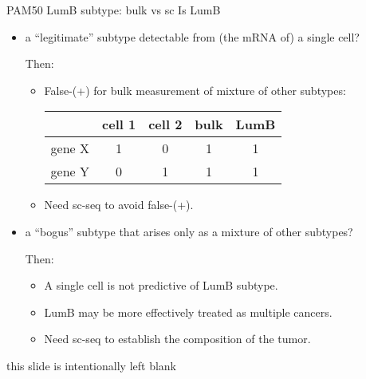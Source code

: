\documentclass[onepage]{beamer}
\begin{document}
\begin{frame}[t]{PAM50 LumB subtype: bulk vs sc}{}
	Is LumB 
	\begin{itemize}
	\item<1->
		a ``legitimate'' subtype detectable from (the mRNA of) a single cell? 
		
		Then:
		
		\begin{itemize}
		\item
			False-(+)
			for
			bulk measurement of mixture of other subtypes:
			
			\begin{table}[]
			\centering
			\begin{tabular}{c|cc|c|c}
				& cell 1 & cell 2 & bulk & LumB \\ \hline
			gene X & 1     & 0     & 1    & 1    \\
			gene Y & 0     & 1     & 1    & 1   
			\end{tabular}
			\end{table}
		\item
			Need sc-seq to avoid false-(+).
		\end{itemize}
		
	\item<2->
		a ``bogus'' subtype that arises only as a mixture of other subtypes? 
		
		Then:
		
		\begin{itemize}
		\item
			A single cell is not predictive of LumB subtype.
		\item
			LumB may be more effectively treated as multiple cancers.
		\item
			Need sc-seq to establish the composition of the tumor.
		\end{itemize}
	\end{itemize}
	
\end{frame}


%
%
\setcounter{finalframe}{\value{framenumber}}
%
%
%
%
%
%
\begin{frame}[plain,b]
	\hfill
	\tiny
	\color{gray}
	this slide is intentionally left blank
\end{frame}
\end{document}
